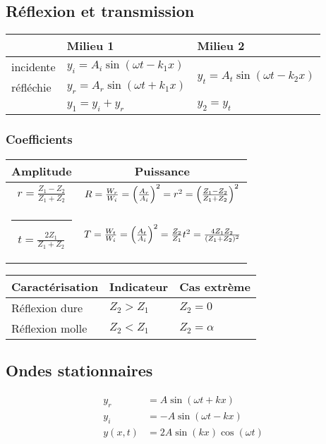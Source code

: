 \subsection{Réflexion et transmission}
\begin{center}
    
\end{center}
\begin{tabular}{ll|l}
    & Milieu 1 & Milieu 2\\\hline
    incidente & \(y_i=A_i\sin (\omega t - k_1 x)\) &  \multirow{2}{*}{\(y_t=A_t \sin (\omega t-k_2 x) \)} \\
    réfléchie &\(y_r=A_r\sin (\omega t + k_1 x)\) & \\\hline
    & \(y_1=y_i+y_r\) & \(y_2=y_t\)
\end{tabular}

\subsubsection{Coefficients}
\begin{tabular}{c|c}
    Amplitude & Puissance\\\hline
    \(r=\frac{Z_1-Z_2}{Z_1+Z_2}\) &  \(R=\frac{W_r}{W_i}=\qty(\frac{A_r}{A_i})^2=r^2=\qty(\frac{Z_1-Z_2}{Z_1+Z_2})^2\)\\\rule{-2.5pt}{20pt}
    \(t=\frac{2Z_1}{Z_1+Z_2}\) & \(T=\frac{W_t}{W_i}=\qty(\frac{A_t}{A_i})^2=\frac{Z_2}{Z_1}t^2=\frac{4Z_1 Z_2}{(Z_1+Z_2)^2}\)
\end{tabular}
\begin{tabular}{lll}
    Caractérisation & Indicateur & Cas extrème\\\hline
    Réflexion dure & \(Z_2>Z_1\) & \(Z_2=0\)\\
    Réflexion molle & \(Z_2<Z_1\) & \(Z_2=\alpha\)
\end{tabular}

\subsection{Ondes stationnaires}
\begin{align*}
    y_r &= A\sin (\omega t +kx)\\ 
    y_i &= -A\sin (\omega t - kx)\\
    y(x,t)&=2A\sin (kx) \cos (\omega t)
\end{align*}

